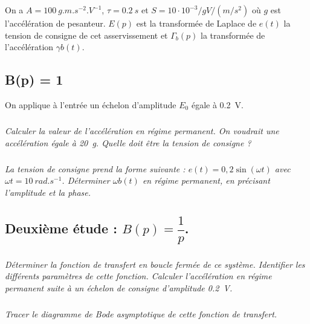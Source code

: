 \documentclass[10pt,fleqn]{article} %
\begin{document}
\begin{multicols}{2}
\begin{center}

\end{center}

On a  $A = \SI{100}{g.m.s^{-2}.V^{-1}}$, $\tau=\SI{0,2}{s}$ et $S = 10\cdot 10^{-3}/g V/(m/s^2)$ où $g$ est l'accélération de pesanteur. $E(p)$ est la transformée de Laplace de $e(t)$ la tension de consigne de cet asservissement et $\Gamma_b(p)$ la transformée de l'accélération $\gamma b(t)$.

\subsection*{B(p) = 1}
On applique à l'entrée un échelon d'amplitude $E_0$ égale à \SI{0,2}{V}.

\subparagraph{}
\textit{Calculer la valeur de l'accélération en régime permanent. On voudrait une accélération égale à \SI{20}{g}. Quelle doit être la tension de consigne ?}

%
%


\subparagraph{}
\textit{La tension de consigne prend la forme suivante : $e(t) = 0,2 \sin\left(\omega t\right)$ avec $\omega t = \SI{10}{rad.s^{-1}}$. Déterminer $\omega b(t)$ en régime permanent, en précisant l'amplitude et la phase.}


\subsection*{Deuxième étude : $B(p) = \dfrac{1}{p}$.}

\subparagraph{}
\textit{Déterminer la fonction de transfert en boucle fermée de ce système. Identifier les différents paramètres de cette fonction. Calculer l'accélération en régime permanent suite à un échelon de consigne d'amplitude \SI{0,2}{V}.}
%


\subparagraph{}
\textit{Tracer le diagramme de Bode asymptotique de cette fonction de transfert.}
\end{multicols}
\end{document}

